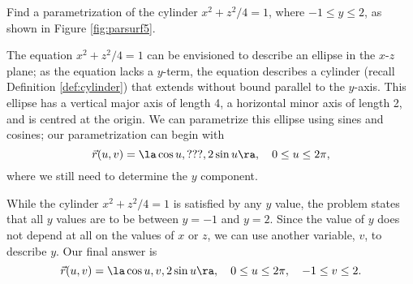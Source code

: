 {Find a parametrization of the cylinder $x^2 + z^2/4=1$, where $-1\leq y\leq 2$, as shown in Figure \ref{fig:parsurf5}. 
}
{The equation $x^2+z^2/4=1$ can be envisioned to describe an ellipse in the $x$-$z$ plane; as the equation lacks a $y$-term, the equation describes a cylinder (recall Definition \ref{def:cylinder}) that extends without bound parallel to the $y$-axis. This ellipse has a vertical major axis of length 4, a horizontal minor axis of length 2, and is centred at the origin. We can parametrize this ellipse using sines and cosines; our parametrization can begin with
\[
\vec r(u,v) = \la \cos u, \text{???}, 2\sin u\ra,\quad 0\leq u\leq 2\pi,
\]
where we still need to determine the $y$ component.


While the cylinder $x^2+z^2/4=1$ is satisfied by any $y$ value, the problem states that all $y$ values are to be between $y=-1$ and $y=2$. Since the value of $y$ does not depend at all on the values of $x$ or $z$, we can use another variable, $v$, to describe $y$. Our final answer is
\[
\vec r(u,v) = \la \cos u, v, 2\sin u\ra, \quad 0\leq u\leq 2\pi,\quad -1\leq v\leq 2.
\]
\baselineskip
}\\

